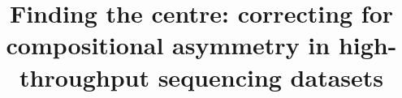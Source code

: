 \documentclass{bmcart}
\begin{document}
\begin{frontmatter}

\begin{fmbox}


\title{Finding the centre: correcting for compositional asymmetry in high-throughput sequencing datasets}


\author[
   addressref={aff1},                   %
   email={jia_wu@hotmail.com}   %
]{ }
\author[
   addressref={aff1},                   %
   email={jean.macklaim@gmail.com}   %
]{ }
\author[
   addressref={aff1},                   %
   email={bgenge3@gmail.com}   %
]{ }
\author[
   addressref={aff1,aff2},
   corref={aff1},
   email={ggloor@uwo.ca}
]{ }


\address[id=aff1]{%
  , %
  ,                     %
  ,                              %
}
\address[id=aff2]{%
  ,
  ,
  ,
}


\end{fmbox}
\end{frontmatter}
\end{document}
